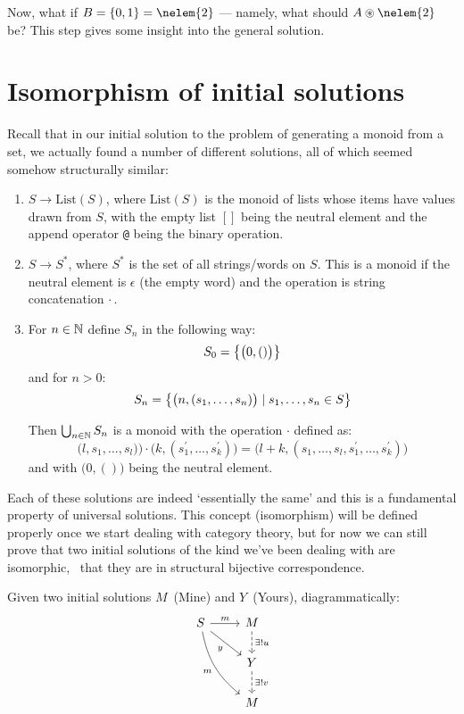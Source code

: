 Now, what if $B = \setof{0, 1} = \nelem{2}$ --- namely, what should $A
\circledast \nelem{2}$ be? This step gives some insight into the general
solution.

\section{Isomorphism of initial solutions}

Recall that in our initial solution to the problem of generating a monoid
from a set, we actually found a number of different solutions, all of which
seemed somehow structurally similar:

\begin{enumerate}

\item $S \to \mathrm{List}(S)$, where $\mathrm{List}(S)$ is the monoid of lists
whose items have values drawn from $S$, with the empty list $[]$ being the
neutral element and the append operator \texttt{@} being the binary
operation.

\item $S \to S^\ast$, where $S^\ast$ is the set of all strings/words on $S$.
This is a monoid if the neutral element is $\epsilon$ (the empty word) and the
operation is string concatenation $\cdot$\,.

\item For $n \in \mathbb{N}$ define $S_n$ in the following way:
\[
S_0 = \big\{  \big(0, ()\big)  \big\}
\]
and for $n > 0$:
\[
S_n
= \big\{ \big(n, (s_1, \ldots, s_n)\big) \mid s_1, \ldots, s_n \in S \big\}
\]

Then $\bigcup_{n\in\mathbb{N}} S_n$ is a monoid with the operation $\cdot$ defined
as:
\[
\big(l, s_1, \ldots, s_l)\big)
\cdot
\big(k, (s_1^\prime, \ldots, s_k^\prime)\big)
=
\big(l + k, (s_1, \ldots, s_l, s_1^\prime, \ldots, s_k^\prime)\big)
\]
and with $\big(0, ()\big)$ being the neutral element.

\end{enumerate}

Each of these solutions are indeed `essentially the same' and this is a
fundamental property of universal solutions. This concept (isomorphism)
will be defined properly once we start dealing with category theory, but for
now we can still prove that two initial solutions of the kind we've been
dealing with are isomorphic, \ie~that they are in structural bijective
correspondence.

Given two initial solutions $M$~(Mine) and $Y$~(Yours), diagrammatically:
$$
\begin{tikzcd}
    S \arrow[r, "m"] \arrow[rd, swap, "y"]
    \arrow[rdd, swap, bend right = 20, "m"] &
    M \arrow[d, dashed, "\exists! u"] \\
    {} & Y \arrow[d, dashed, "\exists! v"] \\
    {} & M
\end{tikzcd}
$$

